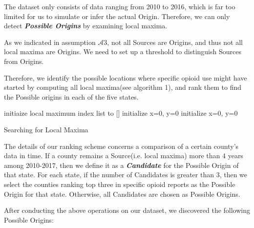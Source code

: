 The dataset only consists of data ranging from 2010 to 2016, which is far too limited for us to simulate or infer the actual Origin. Therefore, we can only detect \textbf{\itshape Possible Origins} by examining local maxima.

As we indicated in assumption $\mathcal{A}3$, not all Sources are Origins, and thus not all local maxima are Origins. We need to set up a threshold to distinguish Sources from Origins. 

Therefore, we identify the possible locations where specific opioid use might have started by computing all local maxima(see algorithm 1), and rank them to find the Possible origins in each of the five states. 

\IncMargin{1em}
\LinesNumbered
\begin{algorithm}[H]
	
	\BlankLine
	initiaize local maximum index list to []
	initialize x=0, y=0\;
	initialize x=0, y=0\;
	\caption{Searching for Local Maxima}
\end{algorithm}
\DecMargin{1em}

The details of our ranking scheme concerns a comparison of a certain county's data in time. If a county remains a Source(i.e. local maxima) more than 4 years among 2010-2017, then we define it as a \textbf{\itshape Candidate} for the Possible Origin of that state. For each state, if the number of Candidates is greater than 3, then we select the counties ranking top three in specific opioid reports as the Possible Origin for that state. Otherwise, all Candidates are chosen as Possible Origins.

After conducting the above operations on our dataset, we discovered the following Possible Origins:

